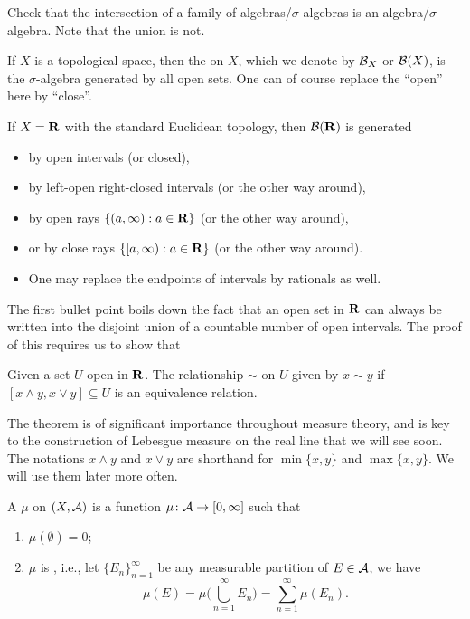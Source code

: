 Check that the intersection of a family of algebras/$\sigma$-algebras is an algebra/$\sigma$-algebra. Note that the union is not.

If $X$ is a topological space, then the  on $X$, which we denote by $\mathcal{B}_X$ or $\mathcal{B}(X)$, is the $\sigma$-algebra generated by all open sets. One can of course replace the ``open'' here by ``close''.

If $X = \mathbf{R}$ with the standard Euclidean topology, then $\mathcal{B}(\mathbf{R})$ is generated  
\begin{itemize}
    \item by open intervals (or closed), 
    \item by left-open right-closed intervals (or the other way around), 
    \item by open rays $\{(a,\infty):a\in\mathbf{R}\}$ (or the other way around),
    \item or by close rays $\{[a,\infty):a\in\mathbf{R}\}$ (or the other way around).
    \item One may replace the endpoints of intervals by rationals as well.
\end{itemize}

The first bullet point boils down the fact that an open set in $\mathbf{R}$ can always be written into the disjoint union of a countable number of open intervals. The proof of this requires us to show that 

\begin{xca}
    Given a set $U$ open in $\mathbf{R}$. The relationship $\sim$ on $U$ given by $x \sim y$ if $[x \land y, x \lor y] \subseteq U$ is an equivalence relation.
\end{xca}
The theorem is of significant importance throughout measure theory, and is key to the construction of Lebesgue measure on the real line that we will see soon. The notations $x \land y$ and $x \lor y$ are shorthand for $\min\{x,y\}$ and $\max\{x,y\}$. We will use them later more often.

\begin{defn}
     A  $\mu$ on $(X,\mathcal{A})$ is a function $\mu\colon\mathcal{A}\to[0,\infty]$ such that \begin{enumerate}
         \item $\mu(\emptyset) = 0$;
         \item \label{enu:countable-additivity-positive-measure} $\mu$ is , i.e., let $\{E_n\}_{n=1}^\infty$ be any measurable partition of $E \in \mathcal{A}$, we have  \[
            \mu(E) = \mu\biggl(\bigcup_{n=1}^\infty E_n\biggr) = \sum_{n=1}^\infty \mu(E_n).
         \]
     \end{enumerate}
\end{defn}

